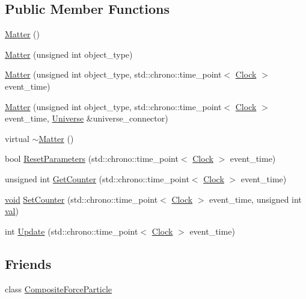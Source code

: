 \subsection*{Public Member Functions}
\begin{DoxyCompactItemize}
\item 
\mbox{\hyperlink{class_matter_ac2dc2f5eeef03d3bdf41a68334ae49b4}{Matter}} ()
\item 
\mbox{\hyperlink{class_matter_a7e2328c2a17dcc7b57af59d1d5c9ea96}{Matter}} (unsigned int object\+\_\+type)
\item 
\mbox{\hyperlink{class_matter_ae15b0b8d811fb2ffd01ea039777d1b95}{Matter}} (unsigned int object\+\_\+type, std\+::chrono\+::time\+\_\+point$<$ \mbox{\hyperlink{universe_8h_a0ef8d951d1ca5ab3cfaf7ab4c7a6fd80}{Clock}} $>$ event\+\_\+time)
\item 
\mbox{\hyperlink{class_matter_a724543a0439d3099f5fc0eae68110b75}{Matter}} (unsigned int object\+\_\+type, std\+::chrono\+::time\+\_\+point$<$ \mbox{\hyperlink{universe_8h_a0ef8d951d1ca5ab3cfaf7ab4c7a6fd80}{Clock}} $>$ event\+\_\+time, \mbox{\hyperlink{class_universe}{Universe}} \&universe\+\_\+connector)
\item 
virtual \mbox{\hyperlink{class_matter_a646fca3d4176950aed6173e1378664e3}{$\sim$\+Matter}} ()
\item 
bool \mbox{\hyperlink{class_matter_adfd93d323e43d09fa8d8b7cdd2258611}{Reset\+Parameters}} (std\+::chrono\+::time\+\_\+point$<$ \mbox{\hyperlink{universe_8h_a0ef8d951d1ca5ab3cfaf7ab4c7a6fd80}{Clock}} $>$ event\+\_\+time)
\item 
unsigned int \mbox{\hyperlink{class_matter_ac667a2f3b6d5d2ce8469efe1596cdd62}{Get\+Counter}} (std\+::chrono\+::time\+\_\+point$<$ \mbox{\hyperlink{universe_8h_a0ef8d951d1ca5ab3cfaf7ab4c7a6fd80}{Clock}} $>$ event\+\_\+time)
\item 
\mbox{\hyperlink{glad_8h_a950fc91edb4504f62f1c577bf4727c29}{void}} \mbox{\hyperlink{class_matter_a514b4a64589eb3fbc3db6b3b356bd687}{Set\+Counter}} (std\+::chrono\+::time\+\_\+point$<$ \mbox{\hyperlink{universe_8h_a0ef8d951d1ca5ab3cfaf7ab4c7a6fd80}{Clock}} $>$ event\+\_\+time, unsigned int \mbox{\hyperlink{glad_8h_a26942fd2ed566ef553eae82d2c109c8f}{val}})
\item 
int \mbox{\hyperlink{class_matter_a56898dd51e5a675832bc82de285b3ef7}{Update}} (std\+::chrono\+::time\+\_\+point$<$ \mbox{\hyperlink{universe_8h_a0ef8d951d1ca5ab3cfaf7ab4c7a6fd80}{Clock}} $>$ event\+\_\+time)
\end{DoxyCompactItemize}
\subsection*{Friends}
\begin{DoxyCompactItemize}
\item 
class \mbox{\hyperlink{class_matter_a9bc6eb2a4c20ce83728a7c9a31b91f19}{Composite\+Force\+Particle}}
\end{DoxyCompactItemize}
